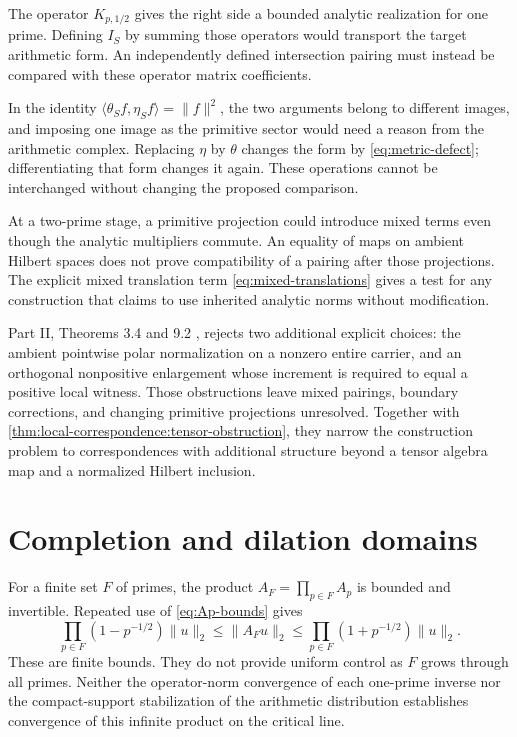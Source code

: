 \documentclass[11pt,letterpaper]{article}
\theoremstyle{definition}
\theoremstyle{remark}
\begin{document}
The operator $K_{p,1/2}$ gives the right side a bounded analytic
realization for one prime. Defining $I_S$ by summing those
operators would transport the target arithmetic form. An
independently defined intersection pairing must instead be
compared with these operator matrix coefficients.

In the identity $\langle\theta_Sf,\eta_Sf\rangle=\|f\|^2$, the two
arguments belong to different images, and imposing one image as
the primitive sector would need a reason from the arithmetic
complex. Replacing $\eta$ by $\theta$ changes the form by
\eqref{eq:metric-defect}; differentiating that form changes it
again. These operations cannot be interchanged without changing
the proposed comparison.

At a two-prime stage, a primitive projection could introduce
mixed terms even though the analytic multipliers commute.
An equality of maps on ambient Hilbert spaces does not prove
compatibility of a pairing after those projections. The explicit
mixed translation term \eqref{eq:mixed-translations} gives a
test for any construction that claims to use inherited analytic
norms without modification.

Part II, Theorems 3.4 and 9.2 \cite{PartII}, rejects two additional explicit choices:
the ambient pointwise polar normalization on a nonzero entire
carrier, and an orthogonal nonpositive enlargement whose
increment is required to equal a positive local witness.
Those obstructions leave mixed pairings, boundary corrections,
and changing primitive projections unresolved. Together with
\cref{thm:local-correspondence:tensor-obstruction}, they narrow
the construction problem to correspondences with additional
structure beyond a tensor algebra map and a normalized Hilbert
inclusion.

\section{Completion and dilation domains}

For a finite set $F$ of primes, the product
$A_F=\prod_{p\in F}A_p$ is bounded and invertible. Repeated use
of \eqref{eq:Ap-bounds} gives
\begin{equation}\label{eq:finite-product-bounds}
 \prod_{p\in F}(1-p^{-1/2})\|u\|_2
 \le\|A_Fu\|_2
 \le\prod_{p\in F}(1+p^{-1/2})\|u\|_2.
\end{equation}
These are finite bounds. They do not provide uniform control
as $F$ grows through all primes. Neither the operator-norm
convergence of each one-prime inverse nor the compact-support
stabilization of the arithmetic distribution establishes
convergence of this infinite product on the critical line.
\end{document}
